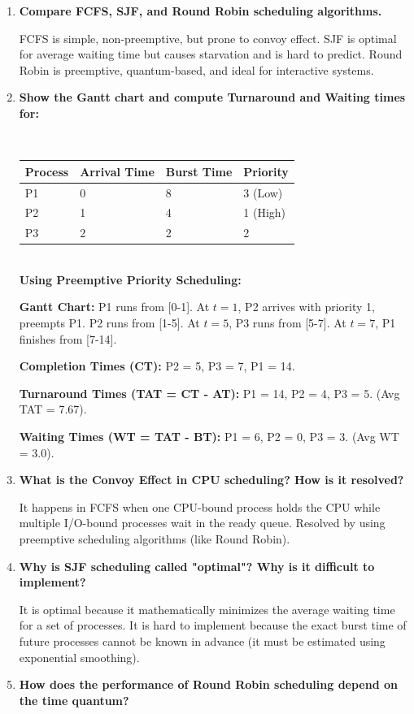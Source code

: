 \documentclass[12pt,a4paper]{article}
\newcommand{\Q}[1]{\textbf{#1}\par\noindent\ignorespaces}
\begin{document}
\begin{tcolorbox}[exambox, title={\textbf{Frequently Asked / Viva Questions}}]
\begin{enumerate}[topsep=0pt, label=\textbf{Q\arabic*.}, itemsep=5pt]
  \item \Q{Compare FCFS, SJF, and Round Robin scheduling algorithms.}
    FCFS is simple, non-preemptive, but prone to convoy effect. SJF is optimal for average waiting time but causes starvation and is hard to predict. Round Robin is preemptive, quantum-based, and ideal for interactive systems.
  \item \Q{Show the Gantt chart and compute Turnaround and Waiting times for:}\\
    \begin{tabularx}{\linewidth}{|B{1.5cm}|Y|Y|Y|}
    \hline
    Process & Arrival Time & Burst Time & Priority \\
    \hline
    P1 & 0 & 8 & 3 (Low) \\
    P2 & 1 & 4 & 1 (High) \\
    P3 & 2 & 2 & 2 \\
    \hline
    \end{tabularx}\\
    \textbf{Using Preemptive Priority Scheduling:}\par
    \textbf{Gantt Chart:} P1 runs from [0-1]. At $t=1$, P2 arrives with priority 1, preempts P1. P2 runs from [1-5]. At $t=5$, P3 runs from [5-7]. At $t=7$, P1 finishes from [7-14].\par
    \textbf{Completion Times (CT):} P2 = 5, P3 = 7, P1 = 14.\par
    \textbf{Turnaround Times (TAT = CT - AT):} P1 = 14, P2 = 4, P3 = 5. (Avg TAT = 7.67).\par
    \textbf{Waiting Times (WT = TAT - BT):} P1 = 6, P2 = 0, P3 = 3. (Avg WT = 3.0).
  \item \Q{What is the Convoy Effect in CPU scheduling? How is it resolved?}
    It happens in FCFS when one CPU-bound process holds the CPU while multiple I/O-bound processes wait in the ready queue. Resolved by using preemptive scheduling algorithms (like Round Robin).
  \item \Q{Why is SJF scheduling called "optimal"? Why is it difficult to implement?}
    It is optimal because it mathematically minimizes the average waiting time for a set of processes. It is hard to implement because the exact burst time of future processes cannot be known in advance (it must be estimated using exponential smoothing).
  \item \Q{How does the performance of Round Robin scheduling depend on the time quantum?}

\end{enumerate}
\end{tcolorbox}
\end{document}
